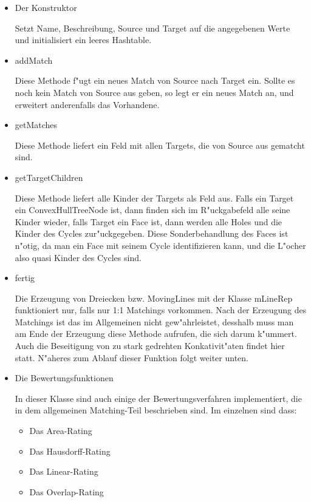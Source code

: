 \begin{itemize}

\item Der Konstruktor

Setzt Name, Beschreibung, Source und Target auf die angegebenen Werte und initialisiert ein leeres Hashtable.

\item addMatch

Diese Methode f"ugt ein neues Match von Source nach Target ein. Sollte es noch kein Match von Source aus geben, so legt er ein neues Match an, und erweitert anderenfalls das Vorhandene.

\item getMatches

Diese Methode liefert ein Feld mit allen Targets, die von Source aus gematcht sind.

\item getTargetChildren

Diese Methode liefert alle Kinder der Targets als Feld aus. Falls ein Target ein ConvexHullTreeNode ist, dann finden sich im R"uckgabefeld alle seine Kinder  wieder, falls Target ein Face ist, dann werden alle Holes und die Kinder des Cycles zur"uckgegeben. Diese Sonderbehandlung des Faces ist n"otig, da man ein Face mit seinem Cycle identifizieren kann, und die L"ocher also quasi Kinder des Cycles sind.

\item fertig

Die Erzeugung von Dreiecken bzw. MovingLines mit der Klasse mLineRep funktioniert nur, falls nur 1:1 Matchings vorkommen. Nach der Erzeugung des Matchings ist das im Allgemeinen nicht gew"ahrleistet, desshalb muss man am Ende der Erzeugung diese Methode aufrufen, die sich darum k"ummert. Auch die Beseitigung von zu stark gedrehten Konkativit"aten findet hier statt. N"aheres zum Ablauf dieser Funktion folgt weiter unten.

\item Die Bewertungsfunktionen

In dieser Klasse sind auch einige der Bewertungsverfahren implementiert, die in dem allgemeinen Matching-Teil beschrieben sind. Im einzelnen sind dass:
\begin{itemize}
\item Das Area-Rating
\item Das Hausdorff-Rating
\item Das Linear-Rating
\item Das Overlap-Rating
\end{itemize}

\end{itemize}

